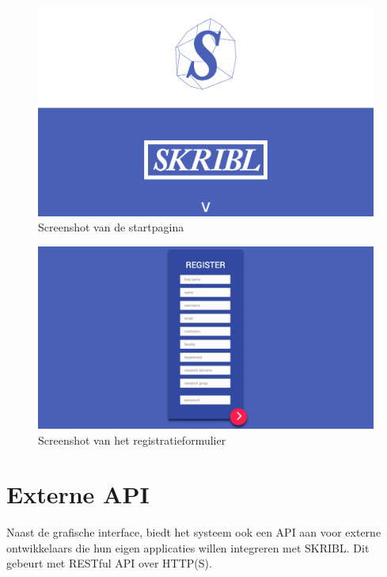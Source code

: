 \documentclass{article}
\begin{document}
\begin{figure}[!h]
\centering
 \includegraphics[width=145mm]{screenshot1.png}
 \caption{Screenshot van de startpagina}
\end{figure}

\begin{figure}[!h]
\centering
 \includegraphics[width=145mm]{screenshot2.png}
 \caption{Screenshot van het registratieformulier}
\end{figure}


\clearpage

\section{Externe API}

Naast de grafische interface, biedt het systeem ook een API aan voor externe ontwikkelaars die hun eigen applicaties willen integreren met SKRIBL. Dit gebeurt met RESTful API over HTTP(S). \\
\end{document}
